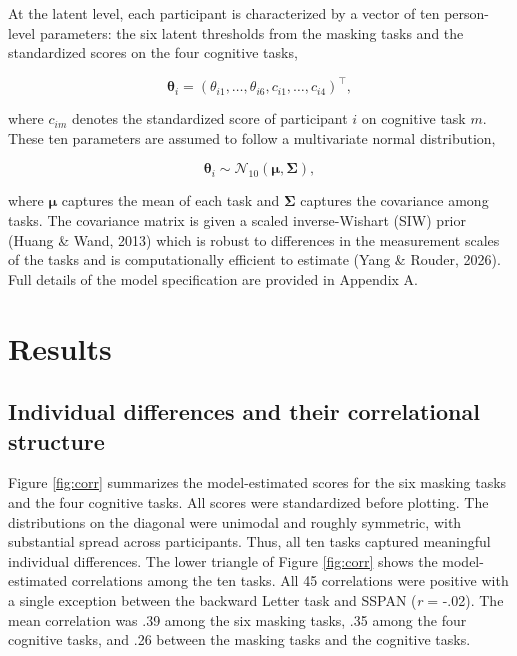 \documentclass[
  ,man]{apa6}
\begin{document}
At the latent level, each participant is characterized by a vector of ten person-level parameters: the six latent thresholds from the masking tasks and the standardized scores on the four cognitive tasks,

\[
\boldsymbol{\theta}_i = \left(\theta_{i1}, \ldots, \theta_{i6}, c_{i1}, \ldots, c_{i4}\right)^\top,
\]

where \(c_{im}\) denotes the standardized score of participant \(i\) on cognitive task \(m\). These ten parameters are assumed to follow a multivariate normal distribution,

\[
\boldsymbol{\theta}_i \sim \mathcal{N}_{10}\!\left(\boldsymbol{\mu}, \boldsymbol{\Sigma}\right),
\]

where \(\boldsymbol{\mu}\) captures the mean of each task and \(\boldsymbol{\Sigma}\) captures the covariance among tasks. The covariance matrix is given a scaled inverse-Wishart (SIW) prior (Huang \& Wand, 2013) which is robust to differences in the measurement scales of the tasks and is computationally efficient to estimate (Yang \& Rouder, 2026). Full details of the model specification are provided in Appendix A.

\section{Results}\label{results}

\subsection{Individual differences and their correlational structure}\label{individual-differences-and-their-correlational-structure}

Figure \ref{fig:corr} summarizes the model-estimated scores for the six masking tasks and the four cognitive tasks. All scores were standardized before plotting. The distributions on the diagonal were unimodal and roughly symmetric, with substantial spread across participants. Thus, all ten tasks captured meaningful individual differences. The lower triangle of Figure \ref{fig:corr} shows the model-estimated correlations among the ten tasks. All 45 correlations were positive with a single exception between the backward Letter task and SSPAN (\emph{r} = -.02). The mean correlation was .39 among the six masking tasks, .35 among the four cognitive tasks, and .26 between the masking tasks and the cognitive tasks.
\end{document}

